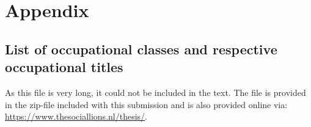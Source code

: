 \documentclass[
10pt, %
a4paper, %
oneside, %
headinclude,footinclude, %
] {book}%
\begin{document}

 



\newpage
\appendix
\chapter{Appendix}
\section{List of occupational classes and respective occupational titles}
As this file is very long, it could not be included in the text. The file is provided in the zip-file included with this submission and is also provided online via: \\ \url{https://www.thesociallions.nl/thesis/}.

\newpage
\end{document}
